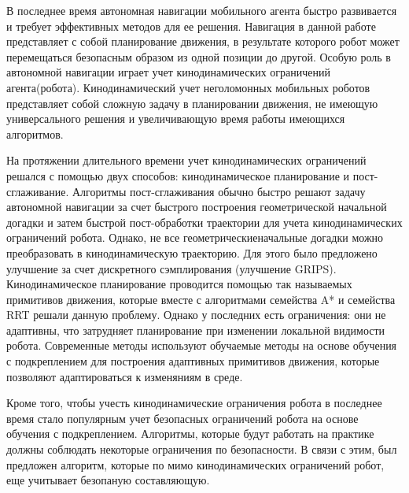 
{\actuality} 

В последнее время автономная навигации мобильного агента быстро развивается и требует эффективных методов для ее решения. Навигация в данной работе 
представляет с собой планирование движения, в результате которого робот может перемещаться безопасным образом из одной позиции до другой. 
Особую роль в автономной навигации играет учет кинодинамических ограничений агента(робота). Кинодинамический учет неголомонных мобильных 
роботов представляет собой сложную задачу в планировании движения, не имеющую универсального решения и увеличивающую время работы имеющихся 
алгоритмов.

На протяжении длительного времени учет кинодинамических ограничений решался с помощью двух способов: кинодинамическое планирование
и пост-сглаживание. Алгоритмы пост-сглаживания обычно быстро решают задачу автономной навигации за счет быстрого построения
геометрической начальной догадки и затем быстрой пост-обработки траектории для учета кинодинамических ограничений робота. Однако, не все 
геометрическиеначальные догадки можно преобразовать в кинодинамическую траекторию. Для этого было предложено улучшение за счет 
дискретного сэмплирования (улучшение GRIPS). Кинодинамическое планирование проводится помощью так называемых примитивов движения, которые вместе 
с алгоритмами семейства A* и семейства RRT решали данную проблему. Однако у последних есть ограничения: они не адаптивны, что затрудняет 
планирование при изменении локальной видимости робота. Современные методы используют обучаемые методы на основе обучения с подкреплением для 
построения адаптивных примитивов движения, которые позволяют адаптироваться к изменяниям в среде.

Кроме того, чтобы учесть кинодинамические ограничения робота в последнее время стало популярным учет безопасных ограничений робота на основе
обучения с подкреплением. Алгоритмы, которые будут работать на практике должны соблюдать некоторые ограничения по безопасности. В связи с этим,
был предложен алгоритм, которые по мимо кинодинамических ограничений робот, еще учитывает безопаную составляющую.



